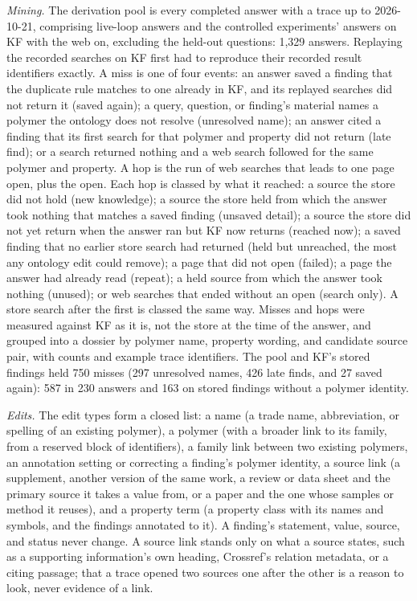 \documentclass[journal=mamobx,manuscript=suppinfo]{achemso}
\begin{document}
\emph{Mining.}
The derivation pool is every completed answer with a trace up to 2026-10-21, comprising live-loop answers and the controlled experiments' answers on KF with the web on, excluding the held-out questions: 1,329 answers.
Replaying the recorded searches on KF first had to reproduce their recorded result identifiers exactly.
A miss is one of four events: an answer saved a finding that the duplicate rule matches to one already in KF, and its replayed searches did not return it (saved again); a query, question, or finding's material names a polymer the ontology does not resolve (unresolved name); an answer cited a finding that its first search for that polymer and property did not return (late find); or a search returned nothing and a web search followed for the same polymer and property.
A hop is the run of web searches that leads to one page open, plus the open.
Each hop is classed by what it reached: a source the store did not hold (new knowledge); a source the store held from which the answer took nothing that matches a saved finding (unsaved detail); a source the store did not yet return when the answer ran but KF now returns (reached now); a saved finding that no earlier store search had returned (held but unreached, the most any ontology edit could remove); a page that did not open (failed); a page the answer had already read (repeat); a held source from which the answer took nothing (unused); or web searches that ended without an open (search only).
A store search after the first is classed the same way.
Misses and hops were measured against KF as it is, not the store at the time of the answer, and grouped into a dossier by polymer name, property wording, and candidate source pair, with counts and example trace identifiers.
The pool and KF's stored findings held 750 misses (297 unresolved names, 426 late finds, and 27 saved again): 587 in 230 answers and 163 on stored findings without a polymer identity.

\emph{Edits.}
The edit types form a closed list: a name (a trade name, abbreviation, or spelling of an existing polymer), a polymer (with a broader link to its family, from a reserved block of identifiers), a family link between two existing polymers, an annotation setting or correcting a finding's polymer identity, a source link (a supplement, another version of the same work, a review or data sheet and the primary source it takes a value from, or a paper and the one whose samples or method it reuses), and a property term (a property class with its names and symbols, and the findings annotated to it).
A finding's statement, value, source, and status never change.
A source link stands only on what a source states, such as a supporting information's own heading, Crossref's relation metadata, or a citing passage; that a trace opened two sources one after the other is a reason to look, never evidence of a link.
\end{document}
